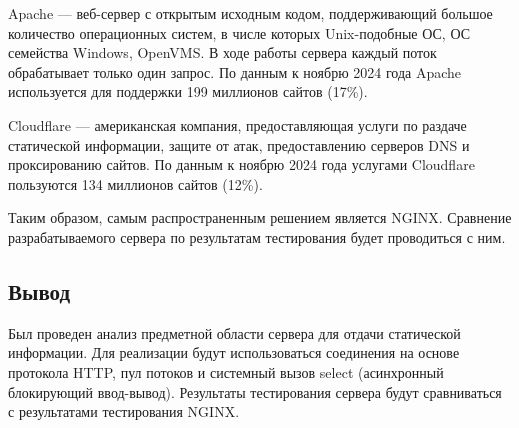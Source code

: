 Apache \cite{apacheserver} --- веб-сервер с открытым исходным кодом, поддерживающий большое количество операционных систем, в числе которых Unix-подобные ОС, ОС семейства Windows, OpenVMS.
В ходе работы сервера каждый поток обрабатывает только один запрос.
По данным \cite{netcraft2024stat} к ноябрю 2024 года Apache используется для поддержки 199 миллионов сайтов (17\%).

Cloudflare \cite{cloudflare} --- американская компания, предоставляющая услуги по раздаче статической информации, защите от атак, предоставлению серверов DNS и проксированию сайтов.
По данным \cite{netcraft2024stat} к ноябрю 2024 года услугами Cloudflare пользуются 134 миллионов сайтов (12\%).

Таким образом, самым распространенным решением является NGINX.
Сравнение разрабатываемого сервера по результатам тестирования будет проводиться с ним.

\subsection*{Вывод}

Был проведен анализ предметной области сервера для отдачи статической информации.
Для реализации будут использоваться соединения на основе протокола HTTP, пул потоков и системный вызов select (асинхронный блокирующий ввод-вывод).
Результаты тестирования сервера будут сравниваться с результатами тестирования NGINX.